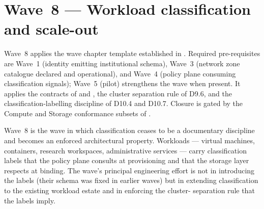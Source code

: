 
\chapter{Wave~8 --- Workload classification and scale-out}
\label{ch:wave8-workload}

\begin{caveatbox}[Dependencies]
\noindent Wave~8 applies the wave chapter template established in
. Required pre-requisites are
Wave~1 (identity emitting institutional schema), Wave~3 (network
zone catalogue declared and operational), and Wave~4 (policy
plane consuming classification signals); Wave~5 (pilot) strengthens the wave when present. It applies the
contracts of  and ,
the cluster separation rule of D9.6, and the
classification-labelling discipline of D10.4 and D10.7. Closure is
gated by the Compute and Storage conformance subsets of
.
\end{caveatbox}

Wave~8 is the wave in which classification ceases to be a
documentary discipline and becomes an enforced architectural
property. Workloads --- virtual machines, containers, research
workspaces, administrative services --- carry classification
labels that the policy plane consults at provisioning and that the
storage layer respects at binding. The wave's principal
engineering effort is not in introducing the labels (their
schema was fixed in earlier waves) but in extending classification
to the existing workload estate and in enforcing the cluster-
separation rule that the labels imply.

